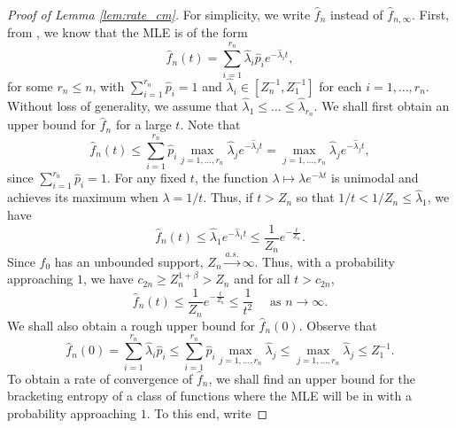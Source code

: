 \documentclass[12pt,letterpaper, twoside, openany]{article}
\theoremstyle{plain}
\begin{document}
		
			

\begin{proof}[Proof of Lemma \ref{lem:rate_cm}]
For simplicity, we write $\hat{f}_n$ instead of $\hat{f}_{n,\infty}$. 	First, from \cite{Jewell1982mixtures}, we know that the MLE is of the form
\begin{equation*}
	\hat{f}_n(t) = \sum^{r_n}_{i=1} \hat{\lambda}_i \hat{p}_i e^{-\hat{\lambda}_i t},
\end{equation*}
for some $r_n \leq n$, with $\sum^{r_n}_{i=1}\hat{p}_i = 1$ and $\hat{\lambda}_i \in [Z_n^{-1}, Z_1^{-1}]$ for each $i=1,\ldots,r_n$.  Without loss of generality, we  assume that $\hat{\lambda}_1 \leq \ldots \leq \hat{\lambda}_{r_n}$. We shall first obtain an upper bound for $\hat{f}_n$ for a large $t$. Note that
\begin{equation*}
	\hat{f}_n(t) \leq \sum^{r_n}_{i=1} \hat{p}_i \max_{j=1,\ldots,r_n} \hat{\lambda}_j e^{-\hat{\lambda}_j t} = \max_{j=1,\ldots,r_n} \hat{\lambda}_j e^{-\hat{\lambda}_j t},
\end{equation*}
since $\sum^{r_n}_{i=1} \hat{p}_i = 1$. For any fixed $t$, the function $\lambda \mapsto \lambda e^{-\lambda t}$ is unimodal and achieves its maximum when $\lambda = 1/t$. Thus, if $t > Z_n$ so that $1/t < 1/Z_n \leq \hat{\lambda}_1$, we have
\begin{equation*}
	\hat{f}_n(t) \leq \hat{\lambda}_1 e^{- \hat{\lambda}_1 t} \leq \frac{1}{Z_n} e^{- \frac{t}{Z_n}}.
\end{equation*}
Since $f_0$ has an unbounded support, $Z_n \stackrel{a.s.}{\rightarrow} \infty$. Thus, with a  probability approaching $1$,  we have $c_{2n} \geq Z^{1+\beta}_n > Z_n$ and for all $t > c_{2n}$, 
\begin{equation}\label{eq:CM_tail_bound}
	\hat{f}_n(t) \leq \frac{1}{Z_n} e^{- \frac{t}{Z_n}} \leq \frac{1}{t^2} \quad \text{ as } n \rightarrow \infty.
\end{equation}
We shall also obtain a rough upper bound for $\hat{f}_n(0)$. Observe that
\begin{equation*}
	\hat{f}_n(0) = \sum^{r_n}_{i=1} \hat{\lambda}_i \hat{p}_i \leq \sum^{r_n}_{i=1} \hat{p}_i \max_{j=1,\ldots,r_n} \hat{\lambda}_j \leq \max_{j=1,\ldots,r_n} \hat{\lambda}_j \leq Z^{-1}_1.
\end{equation*}
To obtain a rate of convergence of $\hat{f}_n$, we shall find an upper bound for the bracketing entropy  of a class of functions where the MLE will be in with a probability approaching $1$.  To this end, write

\end{proof}
\end{document}
